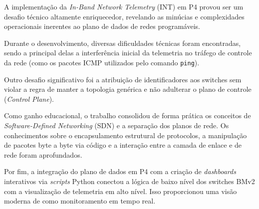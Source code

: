 A implementação da \textit{In-Band Network Telemetry} (INT) em P4 provou ser um desafio técnico altamente enriquecedor, revelando as minúcias e complexidades operacionais inerentes ao plano de dados de redes programáveis.

Durante o desenvolvimento, diversas dificuldades técnicas foram encontradas, sendo a principal delas a interferência inicial da telemetria no tráfego de controle da rede (como os pacotes ICMP utilizados pelo comando \texttt{ping}).

Outro desafio significativo foi a atribuição de identificadores aos switches sem violar a regra de manter a topologia genérica e não adulterar o plano de controle (\textit{Control Plane}). 

Como ganho educacional, o trabalho consolidou de forma prática os conceitos de \textit{Software-Defined Networking} (SDN) e a separação dos planos de rede. Os conhecimentos sobre o encapsulamento estrutural de protocolos, a manipulação de pacotes byte a byte via código e a interação entre a camada de enlace e de rede foram aprofundados.

Por fim, a integração do plano de dados em P4 com a criação de \textit{dashboards} interativos via \textit{scripts} Python conectou a lógica de baixo nível dos switches BMv2 com a visualização de telemetria em alto nível. Isso proporcionou uma visão moderna de como monitoramento em tempo real.
